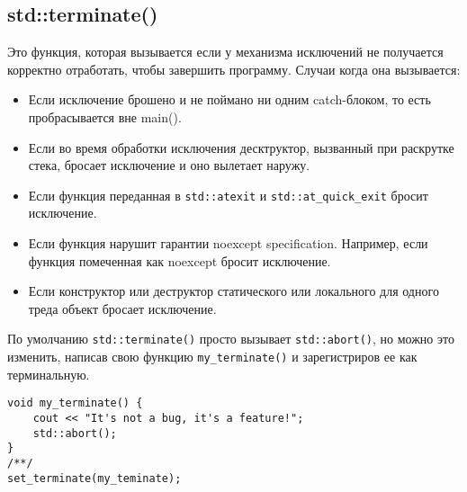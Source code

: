 \subsection{std::terminate()}

Это функция, которая вызывается если у механизма исключений не получается корректно отработать, чтобы завершить программу.
Случаи когда она вызывается:
\begin{itemize}
\item Если исключение брошено и не поймано ни одним catch-блоком, то есть пробрасывается вне main().
\item Если во время обработки исключения десктруктор, вызванный при раскрутке стека, бросает исключение и оно вылетает наружу.
\item Если функция переданная в \texttt{std::atexit} и \texttt{std::at_quick_exit} бросит исключение.
\item Если функция нарушит гарантии noexcept specification. Например, если функция помеченная как noexcept бросит исключение.
\item Если конструктор или деструктор статического или локального для одного треда объект бросает исключение.
\end{itemize}

По умолчанию \texttt{std::terminate()} просто вызывает \texttt{std::abort()}, но можно это изменить, написав свою функцию \texttt{my_terminate()} и зарегистриров ее как терминальную.
\begin{verbatim}
void my_terminate() {
    cout << "It's not a bug, it's a feature!";
    std::abort();
}
/**/
set_terminate(my_teminate);
\end{verbatim}
